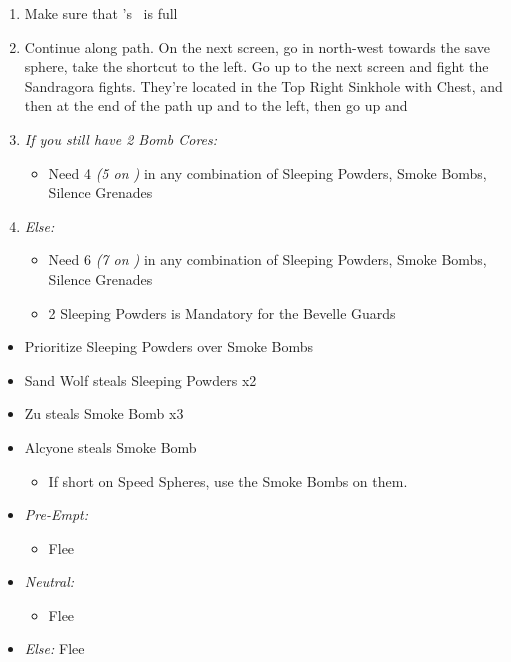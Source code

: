  \begin{enumerate}[resume]
  \item Make sure that \rikku's \od\ is full
  \item Continue along path. On the next screen, go in north-west towards the save sphere, take the shortcut to the left. Go up to the next screen and fight the Sandragora fights. They're located in the Top Right Sinkhole with Chest, and then at the end of the path up and to the left, then go up and \sd
  \item \textit{If you still have 2 Bomb Cores:}
  \begin{itemize}
	\item Need 4 \textit{(5 on \blitzloss)} in any combination of Sleeping Powders, Smoke Bombs, Silence Grenades
  \end{itemize}
  \item \textit{Else:}
  \begin{itemize}
  	\item Need 6 \textit{(7 on \blitzloss)} in any combination of Sleeping Powders, Smoke Bombs, Silence Grenades
  	\item 2 Sleeping Powders is Mandatory for the Bevelle Guards
  \end{itemize}
\end{enumerate}
\begin{encounters}
  \begin{itemize}
    \item Prioritize Sleeping Powders over Smoke Bombs
    \item Sand Wolf steals Sleeping Powders x2
    \item Zu steals Smoke Bomb x3
    \item Alcyone steals Smoke Bomb
          \begin{itemize}
            \item If short on Speed Spheres, use the Smoke Bombs on them.
          \end{itemize}
	\item \textit{Pre-Empt:}
	\begin{itemize}
	\tidusf Defend
	\rikkuf Steal
	\auronf Defend
	\item Flee
 	\end{itemize}
 	\item \textit{Neutral:}
 	\begin{itemize}
	\switch{\tidus}{\kimahri}
 	\kimahrif Steal
 	\switch{\rikku}{\tidus}
 	\item Flee
 	\end{itemize}
	\item \textit{Else:} Flee
  \end{itemize}
\end{encounters}
